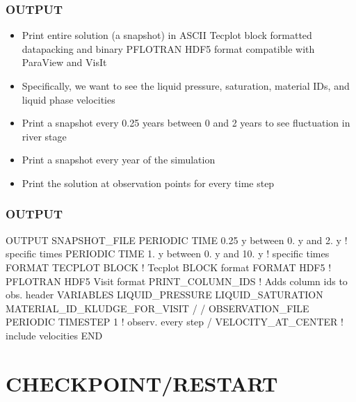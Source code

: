 \documentclass{beamer}
\newcommand\bluecomment[1]{{{\color{blue} #1}}}
\begin{document}
\begin{frame}[fragile]\frametitle{OUTPUT}

\begin{itemize}
\item Print entire solution (a snapshot) in ASCII Tecplot block formatted datapacking and binary PFLOTRAN HDF5 format compatible with ParaView and VisIt
\item Specifically, we want to see the liquid pressure, saturation, material IDs, and liquid phase velocities
\item Print a snapshot every 0.25 years between 0 and 2 years to see fluctuation in river stage
\item Print a snapshot every year of the simulation
\item Print the solution at observation points for every time step
\end{itemize}

\end{frame}

\begin{frame}[fragile]\frametitle{OUTPUT}

\begin{semiverbatim}\small

OUTPUT
  SNAPSHOT_FILE
    PERIODIC TIME 0.25 y between 0. y and 2. y \bluecomment{! specific times}
    PERIODIC TIME 1. y between 0. y and 10. y  \bluecomment{! specific times}
    FORMAT TECPLOT BLOCK  \bluecomment{! Tecplot BLOCK format}
    FORMAT HDF5           \bluecomment{! PFLOTRAN HDF5 Visit format}
    PRINT_COLUMN_IDS      \bluecomment{! Adds column ids to obs. header}
    VARIABLES
      LIQUID_PRESSURE
      LIQUID_SATURATION
      MATERIAL_ID_KLUDGE_FOR_VISIT
    /
  /
  OBSERVATION_FILE
    PERIODIC TIMESTEP 1  \bluecomment{! observ. every step}
  /
  VELOCITY_AT_CENTER     \bluecomment{! include velocities}
END

\end{semiverbatim}

\end{frame}

\section{CHECKPOINT/RESTART}
\end{document}
